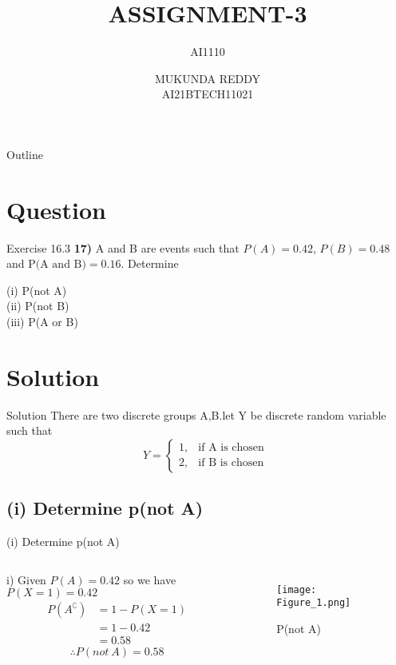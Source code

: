 \documentclass{beamer}
\title[AI1110  Assignment-3]{ASSIGNMENT-3}
\subtitle{AI1110}
\author[]{MUKUNDA REDDY \\ AI21BTECH11021}
\date{}
\begin{document}
 \begin{frame}
    \titlepage
 \end{frame}

 \begin{frame}{Outline}
    \tableofcontents
 \end{frame}

\section{Question}
\begin{frame}{Exercise 16.3}
 \textbf{17)} A and B are events such that $P(A) = 0.42$,
 $P(B) = 0.48$ and $\text{P(A and B)} = 0.16$. Determine \\
 \begin{center}
 (i)   P(not A) \\
 (ii)  P(not B)  \\ 
 (iii) P(A or B) \\
 \end{center}
\end{frame}

\section{Solution}
\begin{frame}{Solution}
There are two discrete groups A,B.let
Y be discrete random variable such that
\[ 
    Y = 
\begin{cases}
    1, & \text{if A is chosen  } \\
    2, & \text{if B is chosen  }
\end{cases} 
\]    
\end{frame}


\subsection{(i) Determine p(not A)}
\begin{frame}{(i) Determine p(not A)}
\begin{columns}
i) Given $P(A) = 0.42$ so we have
${P(X=1) = 0.42}$
\begin{align*}
    P(A^\complement) &= 1 - P(X=1)\\ 
                    &= 1 - 0.42\\   
                    &= 0.58 
\end{align*}
\begin{equation}
 \therefore P(not\ A) = 0.58    
\end{equation}

\begin{figure}
    \centering
    \texttt{[image: Figure\_1.png]}
    \caption{P(not A)}
    \label{fig:1}
\end{figure}

\end{columns}
\end{frame}
\end{document}
